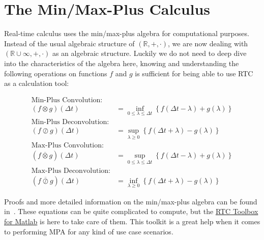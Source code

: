\section{The Min/Max-Plus Calculus}\label{minMaxPlus}

Real-time calculus uses the min/max-plus algebra for computational purposes.
Instead of the usual algebraic structure of \((\mathbb{R},+,\cdot)\), we are now dealing with
\((\mathbb{R}\cup\infty,+,\cdot)\) as an algebraic structure. 
Luckily we do not need to deep dive into the characteristics of the algebra here, 
knowing and understanding the following operations on functions \(f\) and \(g\) is sufficient for being able to
use RTC as a calculation tool:

\begin{align*}
    \text{Min-Plus Convolution:} \\
    (f \otimes g)(\Delta t) &= \inf _{0 \leq \lambda \leq \Delta t} \left\{ f (\Delta t - \lambda) + g (\lambda) \right\} \\
    \text{Min-Plus Deconvolution:} \\
    (f \oslash g)(\Delta t) &= \sup _{\lambda \geq 0} \left\{ f (\Delta t + \lambda) - g (\lambda) \right\} \\
    \text{Max-Plus Convolution:} \\
    (f \overline{\otimes} g)(\Delta t) &= \sup _{0 \leq \lambda \leq \Delta t} \left\{ f (\Delta t - \lambda) + g (\lambda) \right\} \\
    \text{Max-Plus Deconvolution:} \\
    (f \overline{\oslash} g)(\Delta t) &= \inf _{\lambda \geq 0} \left\{ f (\Delta t + \lambda) - g (\lambda) \right\}
\end{align*}

Proofs and more detailed information on the min/max-plus algebra can be found in~\cite{bou}.
These equations can be quite complicated to compute,
but the \href{https://www.mpa.ethz.ch/}{RTC Toolbox for Matlab} is here to take care of them.
This toolkit is a great help when it comes to performing MPA for any kind of use case scenarios.

